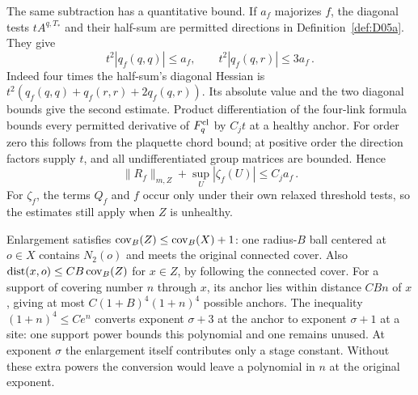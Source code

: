 The same subtraction has a quantitative bound. If $a_f$ majorizes $f$, the diagonal tests $tA^{q,T_*}$ and their half-sum are permitted directions in Definition~\ref{def:D05a}. They give
\begin{equation}\label{eq:D-projection-bound}
t^2|q_f(q,q)|\le a_f,\qquad t^2|q_f(q,r)|\le3a_f\,.
\end{equation}
Indeed four times the half-sum's diagonal Hessian is $t^2(q_f(q,q)+q_f(r,r)+2q_f(q,r))$. Its absolute value and the two diagonal bounds give the second estimate. Product differentiation of the four-link formula bounds every permitted derivative of $F^{\rm cl}_q$ by $C_jt$ at a healthy anchor. For order zero this follows from the plaquette chord bound; at positive order the direction factors supply $t$, and all undifferentiated group matrices are bounded. Hence
\begin{equation}\label{eq:D-remainder-bound}
\|R_f\|_{m,Z}+\sup_U|\zeta_f(U)|\le C_j a_f\,.
\end{equation}
For $\zeta_f$, the terms $Q_f$ and $f$ occur only under their own relaxed threshold tests, so the estimates still apply when $Z$ is unhealthy.

Enlargement satisfies $\operatorname{cov}_B(Z)\le\operatorname{cov}_B(X)+1$: one radius-$B$ ball centered at $o\in X$ contains $N_2(o)$ and meets the original connected cover. Also $\operatorname{dist}(x,o)\le C B\operatorname{cov}_B(Z)$ for $x\in Z$, by following the connected cover. For a support of covering number $n$ through $x$, its anchor lies within distance $C Bn$ of $x$, giving at most $C(1+B)^4(1+n)^4$ possible anchors. The inequality $(1+n)^4\le C e^n$ converts exponent $\sigma+3$ at the anchor to exponent $\sigma+1$ at a site: one support power bounds this polynomial and one remains unused. At exponent $\sigma$ the enlargement itself contributes only a stage constant. Without these extra powers the conversion would leave a polynomial in $n$ at the original exponent.

